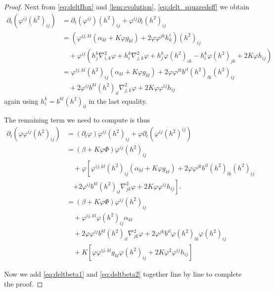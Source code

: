 \documentclass{amsart}
\begin{document}
\begin{proof}
Next from \cref{eq:deltBox} and \cref{lem:evolution}, \cref{eq:delt_squaredsff} we obtain
\[
\begin{split}
\partial_{t} (\varphi^{ij}(h^2)_{ij}) &= \partial_{t}(\varphi^{ij}) (h^2)_{ij} + \varphi^{ij} \partial_t (h^2)_{ij} \\
&= \left(\varphi^{ij,kl} \left(\alpha_{kl} + K \varphi g_{kl}\right) + 2\varphi\varphi^{jk}h^{i}_{k}\right) (h^2)_{ij} \\
&\quad + \varphi^{ij} \left(h^k_j \nabla^2_{i,k} \varphi + h^k_i \nabla^2_{j,k} \varphi + h^k_j \varphi(h^2)_{ik} - h^k_i \varphi(h^2)_{jk} + 2K\varphi h_{ij}\right) \\
&= \varphi^{ij,kl} (h^2)_{ij} \left(\alpha_{kl} + K \varphi g_{kl}\right) + 2\varphi\varphi^{jk} b^{il} (h^2)_{lk} (h^2)_{ij} \\
&\quad + 2 \varphi^{ij} b^{kl} (h^2)_{il} \nabla^2_{j,k} \varphi  + 2K\varphi\varphi^{ij}h_{ij}
\end{split}
\]
again using \(h^k_i = b^{kl} (h^2)_{il}\) in the last equality.

The remaining term we need to compute is thus
\begin{equation}
\label{eq:deltbeta2}
\begin{split}
\partial_{t} (\varphi \varphi^{ij}(h^2)_{ij}) &= (\partial_{t} \varphi) \varphi^{ij}(h^2)_{ij} + \varphi \partial_t (\varphi^{ij} (h^2)^{ij}) \\
&= (\beta + K \varphi\Phi) \varphi^{ij}(h^2)_{ij} \\
&\quad + \varphi \left[\varphi^{ij,kl} (h^2)_{ij} \left(\alpha_{kl} + K \varphi g_{kl}\right) + 2\varphi\varphi^{jk} b^{il} (h^2)_{lk} (h^2)_{ij} \right.\\
&\quad \left. + 2 \varphi^{ij} b^{kl} (h^2)_{il} \nabla^2_{jk} \varphi  + 2K\varphi\varphi^{ij}h_{ij}\right]. \\
&= (\beta + K \varphi\Phi) \varphi^{ij}(h^2)_{ij} \\
&\quad + \varphi^{ij,kl} \varphi (h^2)_{ij} \alpha_{kl}  \\
&\quad + 2 \varphi\varphi^{ij} b^{kl} (h^2)_{il} \nabla^2_{jk} \varphi + 2\varphi^{jk} b^{il} \varphi (h^2)_{lk} \varphi (h^2)_{ij} \\
&\quad + K \left[\varphi \varphi^{ij,kl} g_{kl} \varphi (h^2)_{ij} + 2K\varphi^2\varphi^{ij}h_{ij}\right]
\end{split}
\end{equation}

Now we add \cref{eq:deltbeta1} and \cref{eq:deltbeta2} together line by line to complete the proof.
\end{proof}
\end{document}
